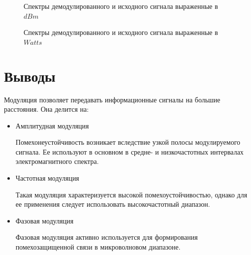 \documentclass[a4paper,14pt]{extarticle}
\begin{document}
\begin{figure}[H]
\caption{Спектры демодулированного и исходного сигнала выраженные в $dBm$}
\label{022}
\end{figure}

\begin{figure}[H]
\caption{Спектры демодулированного и исходного сигнала выраженные в $Watts$}
\label{023}
\end{figure}

\section{Выводы}

Модуляция позволяет передавать информационные сигналы на большие расстояния. Она делится на:

\begin{itemize}
\item Амплитудная модуляция

Помехонеустойчивость возникает вследствие узкой полосы модулируемого сигнала. Ее используют в основном в средне- и низкочастотных интервалах электромагнитного спектра.

\item Частотная модуляция

Такая модуляция характеризуется высокой помехоустойчивостью, однако для ее применения следует использовать высокочастотный диапазон.

\item Фазовая модуляция

Фазовая модуляция активно используется для формирования помехозащищенной связи в микроволновом диапазоне.
\end{itemize}
\end{document}
